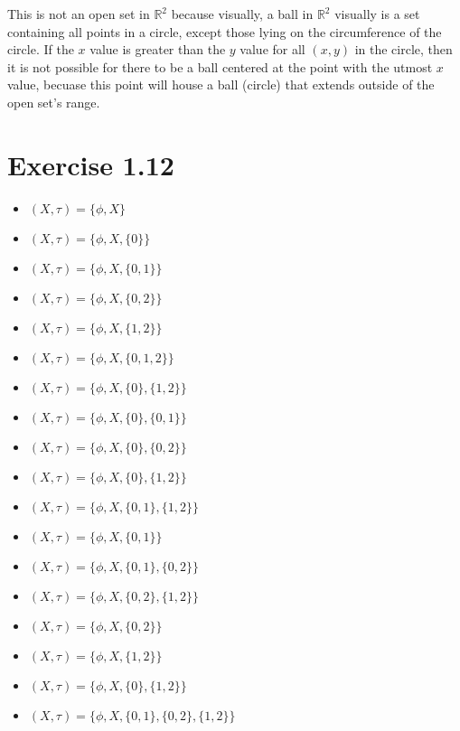 \documentclass{report}
\begin{document}
\medskip

\sol This is not an open set in $\mathbb{R}^2$ because visually, a ball in $\mathbb{R}^2$ visually is a set containing all points in a circle, except those lying on the circumference of the circle. If the $x$ value is greater than the $y$ value for all $(x, y)$ in the circle, then it is not possible for there to be a ball centered at the point with the utmost $x$ value, becuase this point will house a ball (circle) that extends outside of the open set's range. 
\medskip

\section{Exercise 1.12}

\medskip

\sol
\begin{itemize}
  \item $(X, \tau) = \{\phi, X\}$
  \item $(X, \tau) = \{\phi, X, \{0\}\}$
  \item $(X, \tau) = \{\phi, X, \{0, 1\}\}$
  \item $(X, \tau) = \{\phi, X, \{0, 2\}\}$
  \item $(X, \tau) = \{\phi, X, \{1, 2\}\}$
  \item $(X, \tau) = \{\phi, X, \{0, 1, 2\}\}$
  \item $(X, \tau) = \{\phi, X, \{0\}, \{1, 2\}\}$
  \item $(X, \tau) = \{\phi, X, \{0\}, \{0, 1\}\}$
  \item $(X, \tau) = \{\phi, X, \{0\}, \{0, 2\}\}$
  \item $(X, \tau) = \{\phi, X, \{0\}, \{1, 2\}\}$
  \item $(X, \tau) = \{\phi, X, \{0, 1\}, \{1, 2\}\}$
  \item $(X, \tau) = \{\phi, X, \{0, 1\}\}$
  \item $(X, \tau) = \{\phi, X, \{0, 1\}, \{0, 2\}\}$
  \item $(X, \tau) = \{\phi, X, \{0, 2\}, \{1, 2\}\}$
  \item $(X, \tau) = \{\phi, X, \{0, 2\}\}$
  \item $(X, \tau) = \{\phi, X, \{1, 2\}\}$
  \item $(X, \tau) = \{\phi, X, \{0\}, \{1, 2\}\}$
  \item $(X, \tau) = \{\phi, X, \{0, 1\}, \{0, 2\}, \{1, 2\}\}$
\end{itemize}
\end{document}
